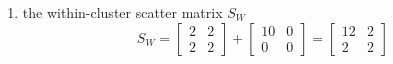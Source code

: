 \documentclass[12pt]{article}
\begin{document}
\begin{enumerate}
$$\begin{aligned}
 0 \\ 0 & 0 \end{bmatrix} + \begin{bmatrix} 4 & 0 \\ 0 & 0 \end{bmatrix} \\ &= \begin{bmatrix} 10 & 0 \\ 0 & 0 \end{bmatrix} 
 \end{aligned} $$ 

\item the within-cluster scatter matrix $S_W$
$$ S_W = \begin{bmatrix} 2 & 2 \\ 2 & 2 \end{bmatrix} + \begin{bmatrix} 10 & 0 \\ 0 & 0 \end{bmatrix} = \begin{bmatrix} 12 & 2 \\ 2 & 2 \end{bmatrix} $$ 


\end{enumerate}
\end{document}
